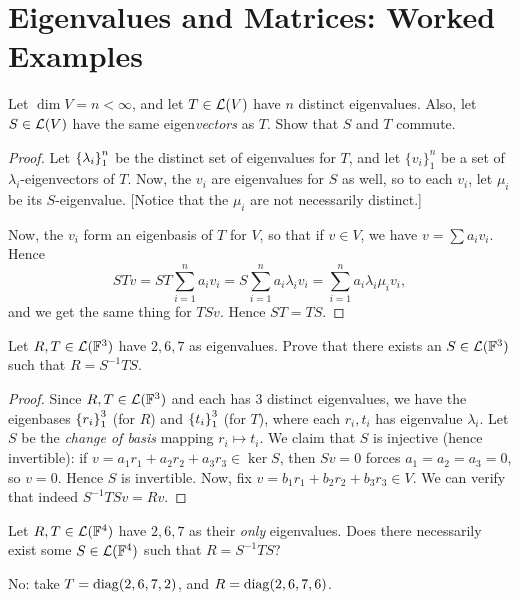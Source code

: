 \documentclass{article}
\begin{document}
\section{Eigenvalues and Matrices: Worked Examples}
\begin{example}
Let $\dim V = n<\infty$, and let $T\in\mathcal L(V)$ have $n$ distinct eigenvalues. Also, let $S\in\mathcal L(V)$ have the same eigen\textit{vectors} as $T$. Show that $S$ and $T$ commute.
\end{example}
\begin{proof}
Let $\left\{\lambda_i\right\}_1^n$ be the distinct set of eigenvalues for $T$, and let $\{v_i\}_1^n$ be a set of $\lambda_i$-eigenvectors of $T$. Now, the $v_i$ are eigenvalues for $S$ as well, so to each $v_i$, let $\mu_i$ be its $S$-eigenvalue. [Notice that the $\mu_i$ are not necessarily distinct.]

Now, the $v_i$ form an eigenbasis of $T$ for $V$, so that if $v\in V$, we have $v = \sum a_iv_i$. Hence
$$STv = ST\sum_{i=1}^n a_iv_i = S\sum_{i=1}^n a_i\lambda_iv_i = \sum_{i=1}^n a_i\lambda_i\mu_i v_i,$$
and we get the same thing for $TSv$. Hence $ST = TS$.
\end{proof}
\begin{example}
Let $R, T\in\mathcal L(\mathbb F^3)$ have $2, 6, 7$ as eigenvalues. Prove that there exists an $S \in\mathcal L(\mathbb F^3)$ such that $R = S^{-1}TS$.
\end{example}
\begin{proof}
Since $R,T\in\mathcal L(\mathbb F^3)$ and each has $3$ distinct eigenvalues, we have the eigenbases $\left\{r_i\right\}_1^3$ (for $R$) and $\left\{t_i\right\}_1^3$ (for $T$), where each $r_i, t_i$ has eigenvalue $\lambda_i$. Let $S$ be the \textit{change of basis} mapping $r_i\mapsto t_i$. We claim that $S$ is injective (hence invertible): if $v = a_1r_1 + a_2r_2 + a_3r_3\in\ker S$, then $Sv = 0$ forces $a_1=a_2=a_3=0$, so $v=0$. Hence $S$ is invertible. Now, fix $v = b_1r_1+b_2r_2 + b_3r_3\in V$. We can verify that indeed $S^{-1}TSv = Rv$.
\end{proof}
\begin{example}
Let $R,T\in\mathcal L(\mathbb F^4)$ have $2,6,7$ as their \textit{only} eigenvalues. Does there necessarily exist some $S\in \mathcal L(\mathbb F^4)$ such that $R = S^{-1}TS$?
\end{example}
\begin{solution}
No: take $T = \operatorname{diag}(2, 6, 7, 2)$, and $R= \operatorname{diag}(2, 6, 7, 6)$.
\end{solution}
\end{document}
